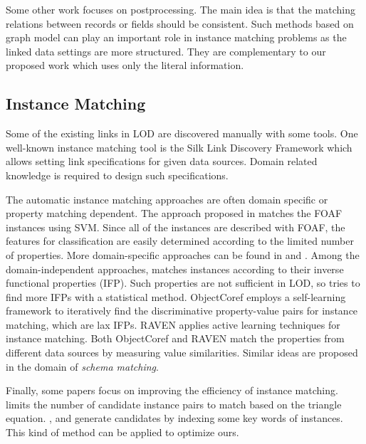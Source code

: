 Some other work focuses on postprocessing. The main idea is that the matching relations between records or fields should be consistent\cite{bansal2004correlation}\cite{pasula2002identity}. Such methods based on graph model can play an important role in instance matching problems as the linked data settings are more structured. They are complementary to our proposed work which uses only the literal information.

\subsection{Instance Matching}

Some of the existing links in LOD are discovered manually with some tools. One well-known instance matching tool is the Silk Link Discovery Framework\cite{volz2009discovering} which allows setting link specifications for given data sources. Domain related knowledge is required to design such specifications.

The automatic instance matching approaches are often domain specific or property matching dependent. The approach proposed in \cite{sleeman2010machine} matches the FOAF instances using SVM. Since all of the instances are described with FOAF, the features for classification are easily determined according to the limited number of properties. More domain-specific approaches can be found in \cite{raimond2008automatic} and \cite{sleeman2010computing}. Among the domain-independent approaches, \cite{hogan2007performing} matches instances according to their inverse functional properties (IFP). Such properties are not sufficient in LOD, so \cite{hogan2010some} tries to find more IFPs with a statistical method. ObjectCoref\cite{hu2011self} employs a self-learning framework to iteratively find the discriminative property-value pairs for instance matching, which are lax IFPs. RAVEN\cite{ngomo2011raven} applies active learning techniques for instance matching. Both ObjectCoref and RAVEN match the properties from different data sources by measuring value similarities. Similar ideas are proposed in the domain of \textit{schema matching}\cite{rahm2001survey}.

Finally, some papers focus on improving the efficiency of instance matching. \cite{ngomo2011limes} limits the number of candidate instance pairs to match based on the triangle equation. \cite{song2011automatically}, \cite{niu2011zhishi} and \cite{isele2011efficient} generate candidates by indexing some key words of instances. This kind of method can be applied to optimize ours.
